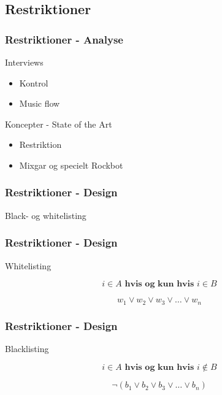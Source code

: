 \subsection{Restriktioner}

\begin{frame}
	\frametitle{Restriktioner - Analyse}
	Interviews
	\begin{itemize}
		\item Kontrol
		\item Music flow
	\end{itemize}
	Koncepter - State of the Art
	\begin{itemize}
		\item Restriktion
		\item Mixgar og specielt Rockbot
	\end{itemize}
\end{frame}

\begin{frame}
	\frametitle{Restriktioner - Design}
	Black- og whitelisting
\end{frame}

\begin{frame}
	\frametitle{Restriktioner - Design}
	Whitelisting
	
	\begin{equation}
		i \in A \textbf{ hvis og kun hvis } i \in B
	\end{equation}
	
	\begin{equation}
		w_1 \vee w_2 \vee w_3 \vee \dots \vee w_n
	\end{equation}
\end{frame}

\begin{frame}
	\frametitle{Restriktioner - Design}
	Blacklisting
	
	\begin{equation}
		i \in A \textbf{ hvis og kun hvis } i \notin B
	\end{equation}
	
	\begin{equation}
		\neg(b_1 \vee b_2 \vee b_3 \vee \dots \vee b_n)
	\end{equation}
\end{frame}

